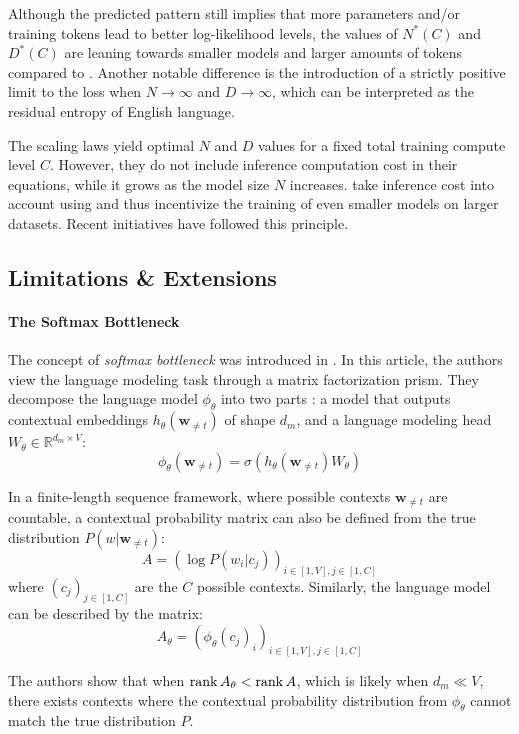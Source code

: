 Although the predicted pattern still implies that more parameters and/or training tokens lead to better log-likelihood levels, the values of $N^*(C)$ and $D^*(C)$ are leaning towards smaller models and larger amounts of tokens compared to \citet{kaplan_scaling}. Another notable difference is the introduction of a strictly positive limit to the loss when $N \rightarrow \infty$ and $D \rightarrow \infty$, which can be interpreted as the residual entropy of English language.

The scaling laws yield optimal $N$ and $D$ values for a fixed total training compute level $C$. However, they do not include inference computation cost in their equations, while it grows as the model size $N$ increases. \citet{beyond_chinchilla} take inference cost into account using  and thus incentivize the training of even smaller models on larger datasets. Recent initiatives \citep{tinyllama,faysse2024croissantllm,gemmateam2024gemma} have followed this principle.

\subsection{Limitations \& Extensions}

\paragraph{The Softmax Bottleneck}

The concept of \textit{softmax bottleneck} was introduced in \citet{softmax_bottleneck}. In this article, the authors view the language modeling task through a matrix factorization prism. They decompose the language model $\phi_\theta$ into two parts : a model that outputs contextual embeddings $h_\theta(\mathbf{w}_{\neq t})$ of shape $d_m$, and a language modeling head $W_\theta \in \mathbb{R}^{d_m \times V}$:
$$
\phi_\theta(\mathbf{w}_{\neq t}) = \sigma (h_\theta(\mathbf{w}_{\neq t}) W_\theta)
$$

In a finite-length sequence framework, where possible contexts $\mathbf{w}_{\neq t}$ are countable, a contextual probability matrix can also be defined from the true distribution $P(w | \mathbf{w}_{\neq t})$:
$$
A = (\log P(w_i | c_j))_{i \in [1, V], j \in [1, C]}
$$
where $(c_j)_{j\in [1, C]}$ are the $C$ possible contexts.
Similarly, the language model can be described by the matrix:
$$
A_\theta = (\phi_\theta(c_j)_i)_{i \in [1, V], j \in [1, C]}
$$ 

The authors show that when $\operatorname{rank} A_\theta < \operatorname{rank} A$, which is likely when $d_m \ll V$, there exists contexts where the contextual probability distribution from $\phi_\theta$ cannot match the true distribution $P$.

